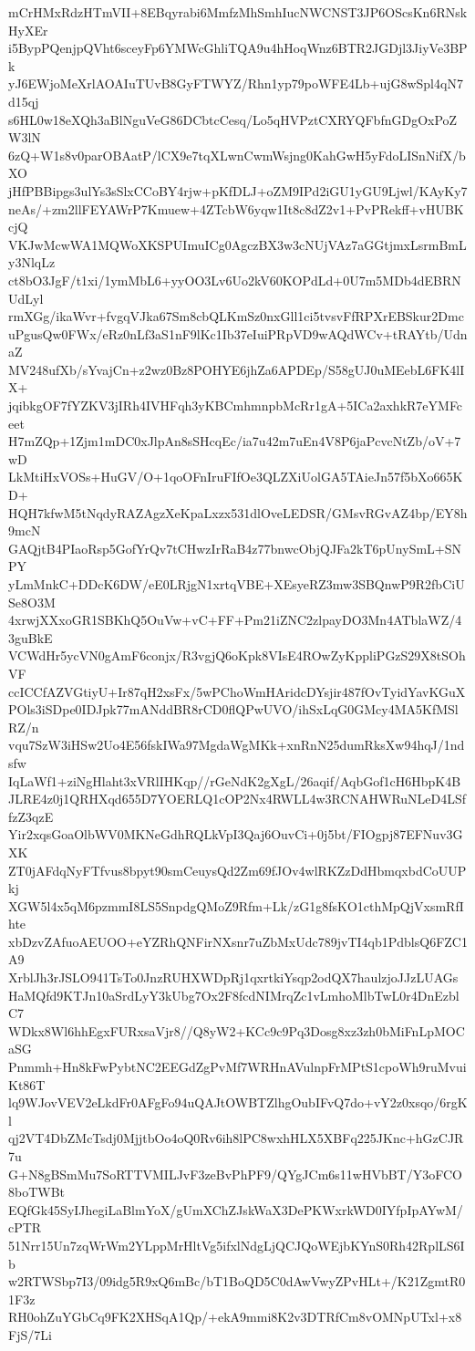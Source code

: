 mCrHMxRdzHTmVII+8EBqyrabi6MmfzMhSmhIucNWCNST3JP6OScsKn6RNskHyXEr
i5BypPQenjpQVht6sceyFp6YMWcGhliTQA9u4hHoqWnz6BTR2JGDjl3JiyVe3BPk
yJ6EWjoMeXrlAOAIuTUvB8GyFTWYZ/Rhn1yp79poWFE4Lb+ujG8wSpl4qN7d15qj
s6HL0w18eXQh3aBlNguVeG86DCbtcCesq/Lo5qHVPztCXRYQFbfnGDgOxPoZW3lN
6zQ+W1s8v0parOBAatP/lCX9e7tqXLwnCwmWsjng0KahGwH5yFdoLISnNifX/bXO
jHfPBBipgs3ulYs3sSlxCCoBY4rjw+pKfDLJ+oZM9IPd2iGU1yGU9Ljwl/KAyKy7
neAs/+zm2llFEYAWrP7Kmuew+4ZTcbW6yqw1It8c8dZ2v1+PvPRekff+vHUBKcjQ
VKJwMcwWA1MQWoXKSPUImuICg0AgczBX3w3cNUjVAz7aGGtjmxLsrmBmLy3NlqLz
ct8bO3JgF/t1xi/1ymMbL6+yyOO3Lv6Uo2kV60KOPdLd+0U7m5MDb4dEBRNUdLyl
rmXGg/ikaWvr+fvgqVJka67Sm8cbQLKmSz0nxGll1ci5tvsvFfRPXrEBSkur2Dmc
uPgusQw0FWx/eRz0nLf3aS1nF9lKc1Ib37eIuiPRpVD9wAQdWCv+tRAYtb/UdnaZ
MV248ufXb/sYvajCn+z2wz0Bz8POHYE6jhZa6APDEp/S58gUJ0uMEebL6FK4lIX+
jqibkgOF7fYZKV3jIRh4IVHFqh3yKBCmhmnpbMcRr1gA+5ICa2axhkR7eYMFceet
H7mZQp+1Zjm1mDC0xJlpAn8sSHcqEc/ia7u42m7uEn4V8P6jaPcvcNtZb/oV+7wD
LkMtiHxVOSs+HuGV/O+1qoOFnIruFIfOe3QLZXiUolGA5TAieJn57f5bXo665KD+
HQH7kfwM5tNqdyRAZAgzXeKpaLxzx531dlOveLEDSR/GMsvRGvAZ4bp/EY8h9mcN
GAQjtB4PIaoRsp5GofYrQv7tCHwzIrRaB4z77bnwcObjQJFa2kT6pUnySmL+SNPY
yLmMnkC+DDcK6DW/eE0LRjgN1xrtqVBE+XEsyeRZ3mw3SBQnwP9R2fbCiUSe8O3M
4xrwjXXxoGR1SBKhQ5OuVw+vC+FF+Pm21iZNC2zlpayDO3Mn4ATblaWZ/43guBkE
VCWdHr5ycVN0gAmF6conjx/R3vgjQ6oKpk8VIsE4ROwZyKppliPGzS29X8tSOhVF
ccICCfAZVGtiyU+Ir87qH2xsFx/5wPChoWmHAridcDYsjir487fOvTyidYavKGuX
POls3iSDpe0IDJpk77mANddBR8rCD0flQPwUVO/ihSxLqG0GMcy4MA5KfMSlRZ/n
vqu7SzW3iHSw2Uo4E56fskIWa97MgdaWgMKk+xnRnN25dumRksXw94hqJ/1ndsfw
IqLaWf1+ziNgHlaht3xVRlIHKqp//rGeNdK2gXgL/26aqif/AqbGof1cH6HbpK4B
JLRE4z0j1QRHXqd655D7YOERLQ1cOP2Nx4RWLL4w3RCNAHWRuNLeD4LSffzZ3qzE
Yir2xqsGoaOlbWV0MKNeGdhRQLkVpI3Qaj6OuvCi+0j5bt/FIOgpj87EFNuv3GXK
ZT0jAFdqNyFTfvus8bpyt90smCeuysQd2Zm69fJOv4wlRKZzDdHbmqxbdCoUUPkj
XGW5l4x5qM6pzmmI8LS5SnpdgQMoZ9Rfm+Lk/zG1g8fsKO1cthMpQjVxsmRfIhte
xbDzvZAfuoAEUOO+eYZRhQNFirNXsnr7uZbMxUdc789jvTI4qb1PdblsQ6FZC1A9
XrblJh3rJSLO941TsTo0JnzRUHXWDpRj1qxrtkiYsqp2odQX7haulzjoJJzLUAGs
HaMQfd9KTJn10aSrdLyY3kUbg7Ox2F8fcdNIMrqZc1vLmhoMlbTwL0r4DnEzblC7
WDkx8Wl6hhEgxFURxsaVjr8//Q8yW2+KCc9c9Pq3Dosg8xz3zh0bMiFnLpMOCaSG
Pnmmh+Hn8kFwPybtNC2EEGdZgPvMf7WRHnAVulnpFrMPtS1cpoWh9ruMvuiKt86T
lq9WJovVEV2eLkdFr0AFgFo94uQAJtOWBTZlhgOubIFvQ7do+vY2z0xsqo/6rgKl
qj2VT4DbZMcTsdj0MjjtbOo4oQ0Rv6ih8lPC8wxhHLX5XBFq225JKnc+hGzCJR7u
G+N8gBSmMu7SoRTTVMILJvF3zeBvPhPF9/QYgJCm6s11wHVbBT/Y3oFCO8boTWBt
EQfGk45SyIJhegiLaBlmYoX/gUmXChZJskWaX3DePKWxrkWD0IYfpIpAYwM/cPTR
51Nrr15Un7zqWrWm2YLppMrHltVg5ifxlNdgLjQCJQoWEjbKYnS0Rh42RplLS6Ib
w2RTWSbp7I3/09idg5R9xQ6mBc/bT1BoQD5C0dAwVwyZPvHLt+/K21ZgmtR01F3z
RH0ohZuYGbCq9FK2XHSqA1Qp/+ekA9mmi8K2v3DTRfCm8vOMNpUTxl+x8FjS/7Li

